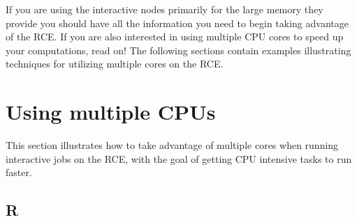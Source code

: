 \documentclass[]{book}
\begin{document}
If you are using the interactive nodes primarily for the large memory
they provide you should have all the information you need to begin
taking advantage of the RCE. If you are also interested in using
multiple CPU cores to speed up your computations, read on! The following
sections contain examples illustrating techniques for utilizing multiple
cores on the RCE.

\section{Using multiple CPUs}\label{using-multiple-cpus}

This section illustrates how to take advantage of multiple cores when
running interactive jobs on the RCE, with the goal of getting CPU
intensive tasks to run faster.

\subsection{R}\label{r}
\end{document}
